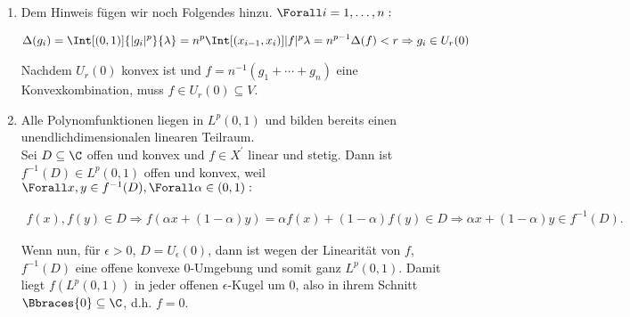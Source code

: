 \begin{solution}
\begin{enumerate}[label = (\alph*)]
\begin{itemize}[label = {}]
  \end{itemize}

  \item
  Dem Hinweis fügen wir noch Folgendes hinzu. $\Forall i = 1, \ldots, n:$

  \begin{align*}
    \Delta(g_i)
    =
    \Int[(0, 1)]{|g_i|^p}{\lambda}
    =
    n^p
    \Int[(x_{i-1}, x_i)]{|f|^p}{\lambda}
    =
    n^{p-1} \Delta(f) < r
    \Rightarrow
    g_i \in U_r(0)
  \end{align*}

  Nachdem $U_r(0)$ konvex ist und $f = n^{-1}(g_1 + \cdots + g_n)$ eine Konvexkombination, muss $f \in U_r(0) \subseteq V$.

  \item
  Alle Polynomfunktionen liegen in $L^p(0, 1)$ und bilden bereits einen unendlichdimensionalen linearen Teilraum. \\

  Sei $D \subseteq \C$ offen und konvex und $f \in X^\prime$ linear und stetig.
  Dann ist $f^{-1}(D) \in L^p(0, 1)$ offen und konvex, weil $\Forall x, y \in f^{-1}(D), \Forall \alpha \in (0, 1):$

  \begin{align*}
    f(x), f(y) \in D
    \Rightarrow
    f(\alpha x + (1 - \alpha) y)
    =
    \alpha f(x) + (1 - \alpha) f(y) \in D
    \Rightarrow
    \alpha x + (1 - \alpha) y \in f^{-1}(D).
  \end{align*}

  Wenn nun, für $\epsilon > 0$, $D = U_\epsilon(0)$, dann ist wegen der Linearität von $f$, $f^{-1}(D)$ eine offene konvexe $0$-Umgebung und somit ganz $L^p(0, 1)$.
  Damit liegt $f(L^p(0, 1))$ in jeder offenen $\epsilon$-Kugel um $0$, also in ihrem Schnitt $\Bbraces{0} \subseteq \C$, d.h. $f = 0$.

\end{enumerate}

\end{solution}
